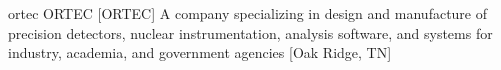 \newglsXcompany%
{ortec}%
{ORTEC\textsuperscript{\textregistered}}%
[ORTEC]%
{A company specializing in design and manufacture of precision detectors, nuclear instrumentation, analysis software, and systems for industry, academia, and government agencies \cite{website:ORTEC}}%
[Oak Ridge, TN]%